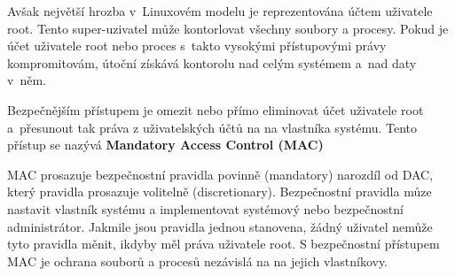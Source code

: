 \documentclass[a4paper,12pt]{article}
\renewcommand{\b}[1]{\textbf{#1}} %
\begin{document}

Avšak největší hrozba v~Linuxovém modelu je reprezentována účtem uživatele root. Tento super-uzivatel může kontorlovat všechny soubory a procesy. Pokud je účet uživatele root nebo proces s~takto vysokými přístupovými právy kompromitovám, útoční získává kontorolu nad celým systémem a~nad daty v~něm.~\cite{Linux_com_MACvsDAC}
 

Bezpečnějším přístupem je omezit nebo přímo eliminovat účet uživatele root a~přesunout tak práva z uživatelských účtů na na vlastníka systému\footnotemark[1]. Tento přístup se nazývá \b{Mandatory Access Control (MAC)}~\cite{Linux_com_MACvsDAC}

MAC prosazuje bezpečnostní pravidla povinně (mandatory) narozdíl od DAC, který pravidla prosazuje volitelně (discretionary). Bezpečnostní pravidla můze nastavit vlastník systému a implementovat systémový nebo bezpečnostní administrátor. Jakmile jsou pravidla jednou stanovena, žádný uživatel nemůže tyto pravidla měnit, ikdyby měl práva uživatele root. S bezpečnostní přístupem MAC je ochrana souborů a procesů nezávislá na na jejich vlastníkovy.~\cite{Linux_com_MACvsDAC}


\end{document}
